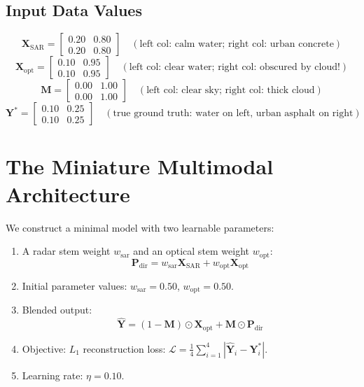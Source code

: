 \subsection{Input Data Values}
\[
\mathbf{X}_{\text{SAR}} = \begin{bmatrix} 0.20 & 0.80 \\ 0.20 & 0.80 \end{bmatrix} \quad (\text{left col: calm water; right col: urban concrete})
\]
\[
\mathbf{X}_{\text{opt}} = \begin{bmatrix} 0.10 & 0.95 \\ 0.10 & 0.95 \end{bmatrix} \quad (\text{left col: clear water; right col: obscured by cloud!})
\]
\[
\mathbf{M} = \begin{bmatrix} 0.00 & 1.00 \\ 0.00 & 1.00 \end{bmatrix} \quad (\text{left col: clear sky; right col: thick cloud})
\]
\[
\mathbf{Y}^* = \begin{bmatrix} 0.10 & 0.25 \\ 0.10 & 0.25 \end{bmatrix} \quad (\text{true ground truth: water on left, urban asphalt on right})
\]

\section{The Miniature Multimodal Architecture}
We construct a minimal model with two learnable parameters:
\begin{enumerate}
    \item A radar stem weight $w_{\text{sar}}$ and an optical stem weight $w_{\text{opt}}$:
    \begin{equation}
    \mathbf{P}_{\text{dir}} = w_{\text{sar}} \mathbf{X}_{\text{SAR}} + w_{\text{opt}} \mathbf{X}_{\text{opt}}
    \end{equation}
    \item Initial parameter values: $w_{\text{sar}} = 0.50$, $w_{\text{opt}} = 0.50$.
    \item Blended output:
    \begin{equation}
    \hat{\mathbf{Y}} = (1 - \mathbf{M}) \odot \mathbf{X}_{\text{opt}} + \mathbf{M} \odot \mathbf{P}_{\text{dir}}
    \end{equation}
    \item Objective: $L_1$ reconstruction loss: $\mathcal{L} = \frac{1}{4} \sum_{i=1}^4 |\hat{\mathbf{Y}}_i - \mathbf{Y}^*_i|$.
    \item Learning rate: $\eta = 0.10$.
\end{enumerate}

